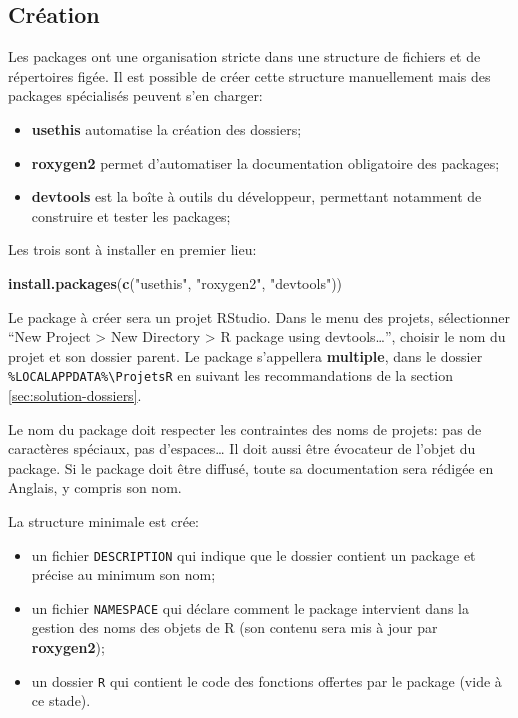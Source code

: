 \documentclass[
  12pt,
  french,
  a4paper,
  extrafontsizes,onecolumn,openright
  ]{memoir}
\newenvironment{Shaded}{\begin{snugshade}}{\end{snugshade}}
\newcommand{\FunctionTok}[1]{\textcolor[rgb]{0.13,0.29,0.53}{\textbf{#1}}}
\newcommand{\NormalTok}[1]{#1}
\newcommand{\StringTok}[1]{\textcolor[rgb]{0.31,0.60,0.02}{#1}}
\providecommand{\tightlist}{%
  \setlength{\itemsep}{0pt}\setlength{\parskip}{0pt}}
\begin{document}
\subsection{Création}\label{cruxe9ation}

Les packages ont une organisation stricte dans une structure de fichiers et de répertoires figée.
Il est possible de créer cette structure manuellement mais des packages spécialisés peuvent s'en charger:

\begin{itemize}
\tightlist
\item
  \textbf{usethis} automatise la création des dossiers;
\item
  \textbf{roxygen2} permet d'automatiser la documentation obligatoire des packages;
\item
  \textbf{devtools} est la boîte à outils du développeur, permettant notamment de construire et tester les packages;
\end{itemize}

Les trois sont à installer en premier lieu:

\scriptsize

\begin{Shaded}
\begin{Highlighting}[]
\FunctionTok{install.packages}\NormalTok{(}\FunctionTok{c}\NormalTok{(}\StringTok{"usethis"}\NormalTok{, }\StringTok{"roxygen2"}\NormalTok{, }\StringTok{"devtools"}\NormalTok{))}
\end{Highlighting}
\end{Shaded}

\normalsize

Le package à créer sera un projet RStudio.
Dans le menu des projets, sélectionner \enquote{New Project \textgreater{} New Directory \textgreater{} R package using devtools\ldots{}}, choisir le nom du projet et son dossier parent.
Le package s'appellera \textbf{multiple}, dans le dossier \texttt{\%LOCALAPPDATA\%\textbackslash{}ProjetsR} en suivant les recommandations de la section \ref{sec:solution-dossiers}.

Le nom du package doit respecter les contraintes des noms de projets: pas de caractères spéciaux, pas d'espaces\ldots{}
Il doit aussi être évocateur de l'objet du package.
Si le package doit être diffusé, toute sa documentation sera rédigée en Anglais, y compris son nom.

La structure minimale est crée:

\begin{itemize}
\tightlist
\item
  un fichier \texttt{DESCRIPTION} qui indique que le dossier contient un package et précise au minimum son nom;
\item
  un fichier \texttt{NAMESPACE} qui déclare comment le package intervient dans la gestion des noms des objets de R (son contenu sera mis à jour par \textbf{roxygen2});
\item
  un dossier \texttt{R} qui contient le code des fonctions offertes par le package (vide à ce stade).
\end{itemize}
\end{document}
